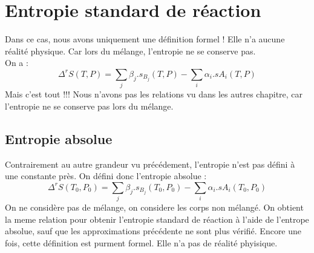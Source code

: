 \section{Entropie standard de réaction}
Dans ce cas, nous avons uniquement une définition formel ! Elle n'a aucune réalité physique. Car lors du mélange, l'entropie ne se conserve pas.\\
On a : 
$$\Delta^r S(T,P) =  \sum_j \beta_{j}.s_{B_j}(T,P) - \sum_i \alpha_i.s{A_i}(T,P)$$
Mais c'est tout !!! Nous n'avons pas les relations vu dans les autres chapitre, car l'entropie ne se conserve pas lors du mélange.
\subsection{Entropie absolue}
Contrairement au autre grandeur vu précédement, l'entropie n'est pas défini à une constante près. On défini donc l'entropie absolue : 
$$\Delta^r S(T_0,P_0) =  \sum_j \beta_{j}.s_{B_j}(T_0,P_0) - \sum_i \alpha_i.s{A_i}(T_0,P_0)$$
On ne considère pas de mélange, on considere les corps non mélangé. On obtient la meme relation pour obtenir l'entropie standard de réaction à l'aide de l'entrope absolue, sauf que les approximations précédente ne sont plus vérifié. Encore une fois, cette définition est purment formel. Elle n'a pas de réalité phyisique.
